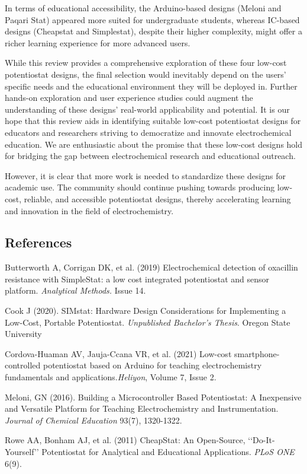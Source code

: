 \documentclass{article}
\begin{document}
In terms of educational accessibility, the Arduino-based designs (Meloni and Paqari Stat) appeared more suited for undergraduate students, whereas IC-based designs (Cheapstat and Simplestat), despite their higher complexity, might offer a richer learning experience for more advanced users.

While this review provides a comprehensive exploration of these four low-cost potentiostat designs, the final selection would inevitably depend on the users' specific needs and the educational environment they will be deployed in. Further hands-on exploration and user experience studies could augment the understanding of these designs' real-world applicability and potential. It is our hope that this review aids in identifying suitable low-cost potentiostat designs for educators and researchers striving to democratize and innovate electrochemical education. We are enthusiastic about the promise that these low-cost designs hold for bridging the gap between electrochemical research and educational outreach.

However, it is clear that more work is needed to standardize these designs for academic use. The community should continue pushing towards producing low-cost, reliable, and accessible potentiostat designs, thereby accelerating learning and innovation in the field of electrochemistry.
\subsection*{References}
Butterworth A, Corrigan DK, et al. (2019) Electrochemical detection of oxacillin resistance with SimpleStat: a low cost integrated potentiostat and sensor platform. \emph{Analytical Methods.} Issue 14. 

Cook J (2020). SIMstat: Hardware Design Considerations for Implementing a Low-Cost, Portable Potentiostat. \emph{Unpublished Bachelor's Thesis}. Oregon State University

Cordova-Huaman AV, Jauja-Ccana VR, et al. (2021) Low-cost smartphone-controlled potentiostat based on Arduino for teaching electrochemistry fundamentals and applications.\emph{Heliyon}, Volume 7, Issue 2. 

Meloni, GN (2016). Building a Microcontroller Based Potentiostat: A Inexpensive and Versatile Platform for Teaching Electrochemistry and Instrumentation. \emph{Journal of Chemical Education} 93(7), 1320-1322. 

Rowe AA, Bonham AJ, et al. (2011) CheapStat: An Open-Source, ‘‘Do-It-Yourself’’ Potentiostat for Analytical and Educational Applications. \emph{PLoS ONE} 6(9).
\end{document}
